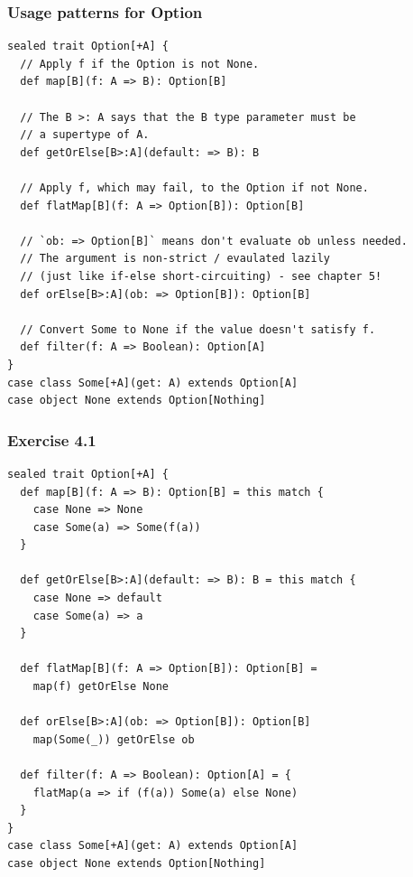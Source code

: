 \documentclass{beamer}
\begin{document}
\begin{frame}[fragile,t]
\frametitle{Usage patterns for Option}
\begin{lstlisting}
sealed trait Option[+A] {
  // Apply f if the Option is not None.
  def map[B](f: A => B): Option[B]

  // The B >: A says that the B type parameter must be
  // a supertype of A.
  def getOrElse[B>:A](default: => B): B

  // Apply f, which may fail, to the Option if not None.
  def flatMap[B](f: A => Option[B]): Option[B]

  // `ob: => Option[B]` means don't evaluate ob unless needed.
  // The argument is non-strict / evaulated lazily
  // (just like if-else short-circuiting) - see chapter 5!
  def orElse[B>:A](ob: => Option[B]): Option[B]

  // Convert Some to None if the value doesn't satisfy f.
  def filter(f: A => Boolean): Option[A]
}
case class Some[+A](get: A) extends Option[A]
case object None extends Option[Nothing]
\end{lstlisting}
\end{frame}

\begin{frame}[fragile,t]
\frametitle{Exercise 4.1}
\begin{lstlisting}
sealed trait Option[+A] {
  def map[B](f: A => B): Option[B] = this match {
    case None => None
    case Some(a) => Some(f(a))
  }

  def getOrElse[B>:A](default: => B): B = this match {
    case None => default
    case Some(a) => a
  }

  def flatMap[B](f: A => Option[B]): Option[B] =
    map(f) getOrElse None

  def orElse[B>:A](ob: => Option[B]): Option[B]
    map(Some(_)) getOrElse ob

  def filter(f: A => Boolean): Option[A] = {
    flatMap(a => if (f(a)) Some(a) else None)
  }
}
case class Some[+A](get: A) extends Option[A]
case object None extends Option[Nothing]
\end{lstlisting}
\end{frame}
\end{document}
